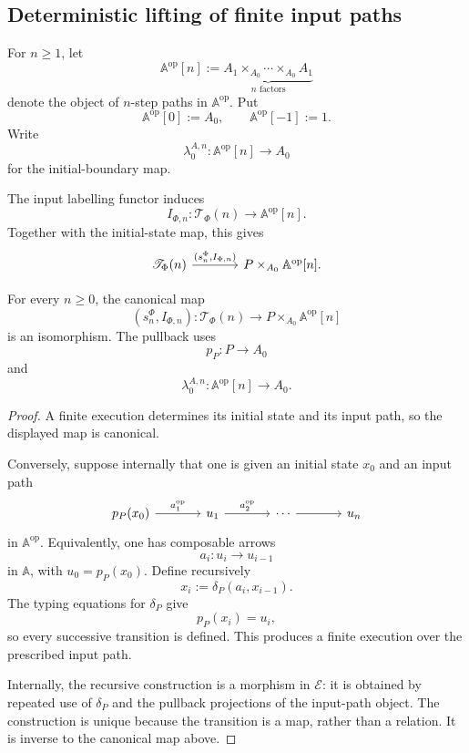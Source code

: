\subsection{Deterministic lifting of finite input paths}
\label{subsec:deterministic-path-lifting}

For \(n\geq1\), let
\[
    \mathbb A^{\mathrm{op}}[n]
    :=
    \underbrace{
    A_1\times_{A_0}\cdots\times_{A_0}A_1
    }_{n\text{ factors}}
\]
denote the object of \(n\)-step paths in \(\mathbb A^{\mathrm{op}}\). Put
\[
    \mathbb A^{\mathrm{op}}[0]:=A_0,
    \qquad
    \mathbb A^{\mathrm{op}}[-1]:=1.
\]
Write
\[
    \lambda_0^{A,n}:
    \mathbb A^{\mathrm{op}}[n]\to A_0
\]
for the initial-boundary map.

The input labelling functor induces
\[
    I_{\Phi,n}:
    \mathscr T_\Phi(n)
    \longrightarrow
    \mathbb A^{\mathrm{op}}[n].
\]
Together with the initial-state map, this gives
\[
\begin{tikzcd}[column sep=large]
    \mathscr T_\Phi(n)
        \arrow[r, "{(s_n^\Phi,I_{\Phi,n})}"]
    &
    P\times_{A_0}\mathbb A^{\mathrm{op}}[n].
\end{tikzcd}
\]

\begin{proposition}
\label{prop:deterministic-path-lifting}
For every \(n\geq0\), the canonical map
\[
    \left(
        s_n^\Phi,
        I_{\Phi,n}
    \right):
    \mathscr T_\Phi(n)
    \longrightarrow
    P\times_{A_0}\mathbb A^{\mathrm{op}}[n]
\]
is an isomorphism. The pullback uses
\[
    p_P:P\to A_0
\]
and
\[
    \lambda_0^{A,n}:
    \mathbb A^{\mathrm{op}}[n]\to A_0.
\]
\end{proposition}

\begin{proof}
A finite execution determines its initial state and its input path, so the
displayed map is canonical.

Conversely, suppose internally that one is given an initial state \(x_0\)
and an input path
\[
\begin{tikzcd}[column sep=large]
    p_P(x_0)
        \arrow[r, "a_1^{\mathrm{op}}"]
    &
    u_1
        \arrow[r, "a_2^{\mathrm{op}}"]
    &
    \cdots
        \arrow[r]
    &
    u_n
\end{tikzcd}
\]
in \(\mathbb A^{\mathrm{op}}\). Equivalently, one has composable arrows
\[
    a_i:u_i\to u_{i-1}
\]
in \(\mathbb A\), with \(u_0=p_P(x_0)\). Define recursively
\[
    x_i:=\delta_P(a_i,x_{i-1}).
\]
The typing equations for \(\delta_P\) give
\[
    p_P(x_i)=u_i,
\]
so every successive transition is defined. This produces a finite execution
over the prescribed input path.

Internally, the recursive construction is a morphism in \(\mathcal E\): it is
obtained by repeated use of \(\delta_P\) and the pullback projections of the
input-path object. The construction is unique because the transition is a
map, rather than a relation. It is inverse to the canonical map above.
\end{proof}

